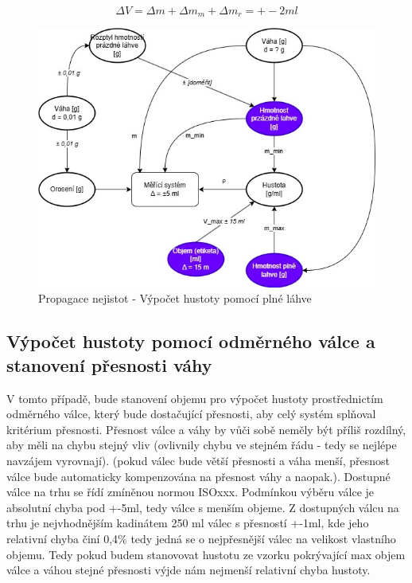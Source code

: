 \[\Delta V = \Delta m + \Delta m_m + \Delta m_r = +- 2 ml\]


\begin{figure}[H]
    \begin{center}
        \includegraphics[scale=0.6]{obrazky/Propagace nejistot-Metoda1+.jpg}
    \end{center}
    \caption{Propagace nejistot - Výpočet hustoty pomocí plné láhve}
\end{figure}

\subsection{Výpočet hustoty pomocí odměrného válce a stanovení přesnosti váhy}

V tomto případě, bude stanovení objemu pro výpočet hustoty prostřednictím odměrného válce, který bude dostačující přesnosti, aby celý systém splňoval kritérium přesnosti. Přesnost válce a váhy by vůči sobě neměly být příliš rozdílný, aby měli na chybu stejný vliv (ovlivnily chybu ve stejném řádu - tedy se nejlépe navzájem vyrovnají). (pokud válec bude větší přesnosti a váha menší, přesnost válce bude automaticky kompenzována na přesnost váhy a naopak.). Dostupné válce na trhu se řídí zmíněnou normou ISOxxx. Podmínkou výběru válce je absolutní chyba pod +-5ml, tedy válce s menším objeme. Z dostupných válcu na trhu je nejvhodnějším kadinátem 250 ml válec s přesností +-1ml, kde jeho relativní chyba činí 0,4\% tedy jedná se o nejpřesnější válec na velikost vlastního objemu. Tedy pokud budem stanovovat hustotu ze vzorku pokrývající max objem válce a váhou stejné přesnosti výjde nám nejmenší relativní chyba hustoty.

